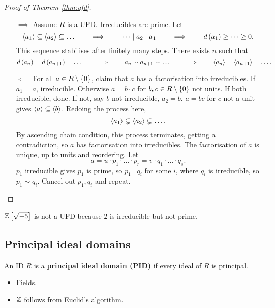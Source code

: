 \begin{proof}[Proof of Theorem \ref{thm:ufd}]
\hfill
\begin{itemize}
\item[$ \implies $] Assume $ R $ is a UFD. Irreducibles are prime. Let
$$ \left\langle a_1 \right\rangle \subseteq \left\langle a_2 \right\rangle \subseteq \dots \qquad \implies \qquad \dots \mid a_2 \mid a_1 \qquad \implies \qquad d\left( a_1 \right) \ge \dots \ge 0. $$
This sequence stabilises after finitely many steps. There exists $ n $ such that
$$ d\left( a_n \right) = d\left( a_{n + 1} \right) = \dots \qquad \implies \qquad a_n \sim a_{n + 1} \sim \dots \qquad \implies \qquad \left\langle a_n \right\rangle = \left\langle a_{n + 1} \right\rangle = \dots. $$
\item[$ \impliedby $] For all $ a \in R \setminus \left\{ 0 \right\} $, claim that $ a $ has a factorisation into irreducibles. If $ a_1 = a $, irreducible. Otherwise $ a = b \cdot c $ for $ b, c \in R \setminus \left\{ 0 \right\} $ not units. If both irreducible, done. If not, say $ b $ not irreducible, $ a_2 = b $. $ a = bc $ for $ c $ not a unit gives $ \left\langle a \right\rangle \subsetneq \left\langle b \right\rangle $. Redoing the process here,
$$ \left\langle a_1 \right\rangle \subsetneq \left\langle a_2 \right\rangle \subsetneq \dots. $$
By ascending chain condition, this process terminates, getting a contradiction, so $ a $ has factorisation into irreducibles. The factorisation of $ a $ is unique, up to units and reordering. Let
$$ a = u \cdot p_1 \cdot \dots \cdot p_r = v \cdot q_1 \cdot \dots \cdot q_s. $$
$ p_1 $ irreducible gives $ p_1 $ is prime, so $ p_1 \mid q_i $ for some $ i $, where $ q_i $ is irreducible, so $ p_1 \sim q_i $. Cancel out $ p_1, q_i $ and repeat.
\end{itemize}
\end{proof}

\begin{remark*}
$ \mathbb{Z}\left[ \sqrt{-5} \right] $ is not a UFD because $ 2 $ is irreducible but not prime.
\end{remark*}

\pagebreak

\subsection{Principal ideal domains}

\begin{definition}
An ID $ R $ is a \textbf{principal ideal domain (PID)} if every ideal of $ R $ is principal.
\end{definition}

\begin{example*}
\hfill
\begin{itemize}
\item Fields.
\item $ \mathbb{Z} $ follows from Euclid's algorithm.
\end{itemize}
\end{example*}

